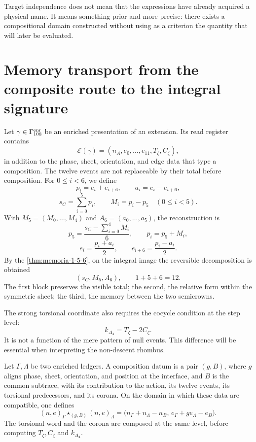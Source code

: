 Target independence does not mean that the expressions have already acquired
a physical name. It means something prior and more precise: there exists a
compositional domain constructed without using as a criterion the quantity that will later be
evaluated.

\section{Memory transport from the composite route to the integral signature}
\label{sec:memoria-composicion-especies-rev6}

Let \(\gamma\in\Gamma_{108}^{\rm enr}\) be an enriched presentation of an
extension. Its read register contains
\[
 \mathcal E(\gamma)
 =
 (n_A,e_0,\ldots,e_{11},T_\zeta,C_\zeta),
\]
in addition to the phase, sheet, orientation, and edge data that type a composition.
The twelve events are not replaceable by their total before composition. For
\(0\le i<6\), we define
\[
 p_i=e_i+e_{i+6},
 \qquad
 a_i=e_i-e_{i+6},
\]
\[
 s_C=\sum_{i=0}^{5}p_i,
 \qquad
 M_i=p_i-p_5\quad(0\le i<5).
\]
With \(M_5=(M_0,\ldots,M_4)\) and
\(A_6=(a_0,\ldots,a_5)\), the reconstruction is
\[
 p_5=\frac{s_C-\sum_{i=0}^{4}M_i}{6},
 \qquad
 p_i=p_5+M_i,
\]
\[
 e_i=\frac{p_i+a_i}{2},
 \qquad
 e_{i+6}=\frac{p_i-a_i}{2}.
\]
By the \cref{thm:memoria-1-5-6}, on the integral image the
reversible decomposition is obtained
\[
 \boxed{(s_C,M_5,A_6),\qquad 1+5+6=12.}
\]
The first block preserves the visible total; the second, the relative form
within the symmetric sheet; the third, the memory between the two semicrowns.

The strong torsional coordinate also requires the cocycle condition at the step level:
\[
 k_{\Delta_4}=T_\zeta-2C_\zeta.
\]
It is not a function of the mere pattern of null events. This difference will be
essential when interpreting the non-descent rhombus.

\begin{definition}
\label{def:dato-empalme-orientado-rev6}
Let \(\Gamma,\Lambda\) be two enriched ledgers. A composition datum is a
pair \((g,B)\), where \(g\) aligns phase, sheet, orientation, and position at the
interface, and \(B\) is the common subtrace, with its contribution to the action, its
twelve events, its torsional predecessors, and its corona. On the domain in
which these data are compatible, one defines
\[
 \boxed{
 {(n,e)}_\Gamma\star_{(g,B)}{(n,e)}_\Lambda
 =
 \bigl(
 n_\Gamma+n_\Lambda-n_B,\,
 e_\Gamma+g e_\Lambda-e_B
 \bigr).}
\]
The torsional word and the corona are composed at the same level, before
computing \(T_\zeta,C_\zeta\) and \(k_{\Delta_4}\).
\end{definition}

